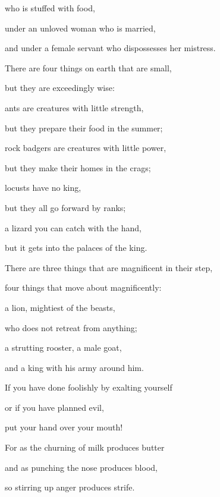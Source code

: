 {who is stuffed
with food,
\par }{\Q {}under
an unloved
woman who is married,
\par }{\Q and under a female servant
who dispossesses
her mistress.
\par }{\Q {}There are four
things on earth
that are
small,
\par }{\Q but they
are exceedingly
wise:
\par }{\Q {}ants
are creatures with little strength,
\par }{\Q but
they prepare
their food
in the summer;
\par }{\Q {}rock badgers
are creatures with little power,
\par }{\Q but
they make
their homes
in the crags;
\par }{\Q {}locusts
have no
king,
\par }{\Q but they all
go forward
by ranks;
\par }{\Q {}a lizard
you can catch with the hand,
\par }{\Q but it
gets
into the palaces
of the king.
\par }{\Q {}There
are three
things that are magnificent
in their step,
\par }{\Q four
things that move
about magnificently:
\par }{\Q {}a lion,
mightiest
of the beasts,
\par }{\Q who does not
retreat
from anything;
\par }{\Q {}a strutting rooster,
a male goat,
\par }{\Q and a king
with
his army around him.
\par }{\Q {}If
you have done foolishly
by exalting
yourself

\par }{\Q or if
you have planned
evil,
\par }{\Q put your hand
over your mouth!
\par }{\Q {}For
as the churning
of milk
produces
butter
\par }{\Q and as punching
the nose
produces
blood,
\par }{\Q so stirring
up anger
produces
strife.


}
